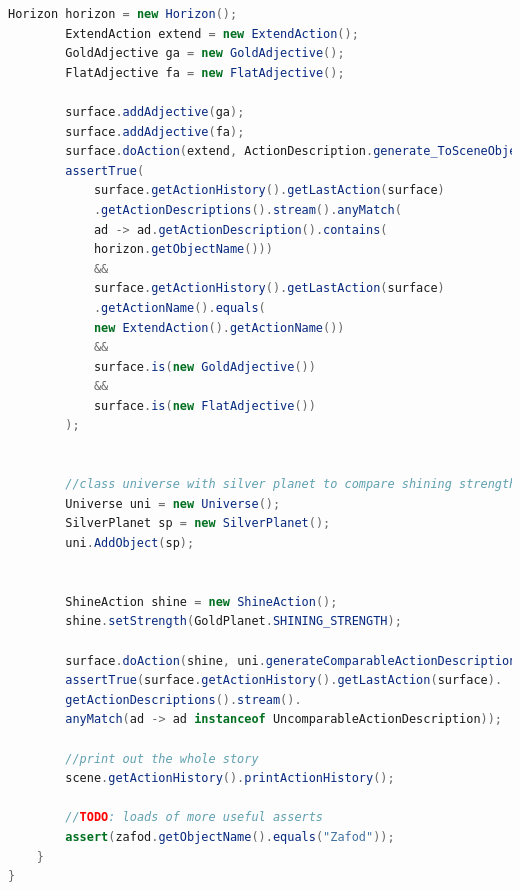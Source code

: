 \begin{lstlisting}[language=java]
		Horizon horizon = new Horizon();
		ExtendAction extend = new ExtendAction();
		GoldAdjective ga = new GoldAdjective();
		FlatAdjective fa = new FlatAdjective();
		
		surface.addAdjective(ga);
		surface.addAdjective(fa);
		surface.doAction(extend, ActionDescription.generate_ToSceneObject_Description(horizon), ActionDescription.generate_ToPlace_Description(DestinationEnum.all_sides));
		assertTrue(
			surface.getActionHistory().getLastAction(surface)
			.getActionDescriptions().stream().anyMatch(
			ad -> ad.getActionDescription().contains(
			horizon.getObjectName()))
			&&
			surface.getActionHistory().getLastAction(surface)
			.getActionName().equals(
			new ExtendAction().getActionName())
			&&
			surface.is(new GoldAdjective())
			&&
			surface.is(new FlatAdjective())
		);
		
		
		//class universe with silver planet to compare shining strength to
		Universe uni = new Universe();
		SilverPlanet sp = new SilverPlanet();
		uni.AddObject(sp);
		
		
		ShineAction shine = new ShineAction();
		shine.setStrength(GoldPlanet.SHINING_STRENGTH);
		
		surface.doAction(shine, uni.generateComparableActionDescription(new GoldPlanet(), shine, new ShineAction()));
		assertTrue(surface.getActionHistory().getLastAction(surface).
		getActionDescriptions().stream().
		anyMatch(ad -> ad instanceof UncomparableActionDescription));
		
		//print out the whole story
		scene.getActionHistory().printActionHistory();
		
		//TODO: loads of more useful asserts
		assert(zafod.getObjectName().equals("Zafod"));
	}
}
\end{lstlisting}